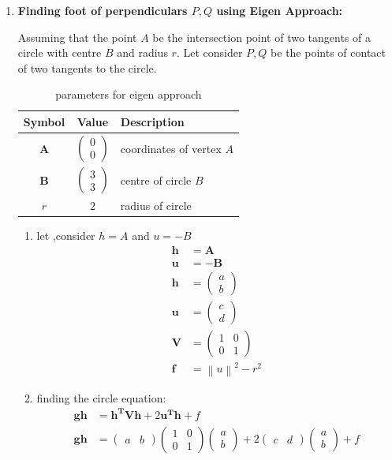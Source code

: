 \documentclass[11pt, a4paper]{article}
\newcommand{\myvec}[1]{\ensuremath{\begin{pmatrix}#1\end{pmatrix}}}
\let\vec\mathbf
\providecommand{\norm}[1]{\left\lVert#1\right\rVert}
\begin{document}
%
\begin{enumerate}
\item \textbf{Finding foot of perpendiculars $P,Q$ using Eigen Approach:} 


Assuming that the point $A$ be the intersection point of two tangents of a circle with centre $B$ and radius $r$. Let consider $P,Q$ be the points of contact of two tangents to the circle.

\begin{table}[H]
\begin{center}
 \begin{tabular}{|c|c|p{6cm}|}
	 \hline  \label{tab:table2}
        \textbf{Symbol} & \textbf{Value} & \textbf{Description} \\
        \hline
	 $\vec{A}$ & $\myvec{0 \\ 0}$ & coordinates of vertex $A$ \\
        \hline
	 $\vec{B}$ & $\myvec{3 \\ 3}$ & centre of circle $B$ \\
        \hline
        $r$ & $2$ & radius of circle \\
        \hline
    \end{tabular}
\end{center}
\caption{parameters for eigen approach}
\end{table}

\begin{enumerate}

\item let ,consider $h = A$ and $u=-B$
\begin{align}
	\vec{h} &=\vec{A} \label{eq:h} \\
	\vec{u} &=\vec{-B} \\
	\vec{h} &=\myvec{a \\ b} \\
\vec{u} &= \myvec{c \\ d}  \\
	\vec{V} &= \myvec{1 & 0 \\ 0 & 1} \\
	\vec{f} &= \norm{u}^2-r^2   \label{eq:f}
\end{align}

\item finding the circle equation: 
\begin{align}
	\vec{gh} &= \vec{h^T}\vec{V}\vec{h} + 2\vec{u^T}\vec{h} + f    \label{eq:gh}\\
	\vec{gh} &= \myvec{a &b}\myvec{1 & 0 \\ 0 & 1}\myvec{a \\ b} + 2\myvec{c& d}\myvec{a \\b } + f   \label{eq:gh2} \\
\end{align}


\end{enumerate}
\end{enumerate}
\end{document}
